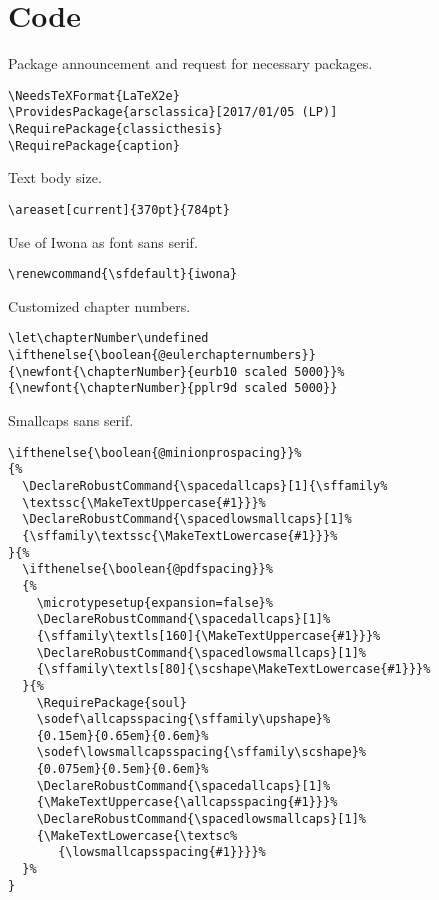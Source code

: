 
\chapter{Code}
\label{chp:code}
 
\lstset{numbers=left,
    numberstyle=\scriptsize,
    stepnumber=1,
    numbersep=8pt
}    



Package announcement and request for necessary packages.
\begin{lstlisting}[firstnumber=1]
\NeedsTeXFormat{LaTeX2e}
\ProvidesPackage{arsclassica}[2017/01/05 (LP)]
\RequirePackage{classicthesis}
\RequirePackage{caption}
\end{lstlisting}



Text body size.
\begin{lstlisting}
\areaset[current]{370pt}{784pt}
\end{lstlisting}



Use of Iwona as font sans serif.
\begin{lstlisting}
\renewcommand{\sfdefault}{iwona}
\end{lstlisting}



Customized chapter numbers.
\begin{lstlisting}
\let\chapterNumber\undefined 
\ifthenelse{\boolean{@eulerchapternumbers}}
{\newfont{\chapterNumber}{eurb10 scaled 5000}}% 
{\newfont{\chapterNumber}{pplr9d scaled 5000}}
\end{lstlisting}



Smallcaps sans serif.
\begin{lstlisting}
\ifthenelse{\boolean{@minionprospacing}}%
{%
  \DeclareRobustCommand{\spacedallcaps}[1]{\sffamily%
  \textssc{\MakeTextUppercase{#1}}}%
  \DeclareRobustCommand{\spacedlowsmallcaps}[1]%
  {\sffamily\textssc{\MakeTextLowercase{#1}}}%
}{%
  \ifthenelse{\boolean{@pdfspacing}}%
  {%
    \microtypesetup{expansion=false}%
    \DeclareRobustCommand{\spacedallcaps}[1]%
    {\sffamily\textls[160]{\MakeTextUppercase{#1}}}%
    \DeclareRobustCommand{\spacedlowsmallcaps}[1]%
    {\sffamily\textls[80]{\scshape\MakeTextLowercase{#1}}}%
  }{%
    \RequirePackage{soul} 
    \sodef\allcapsspacing{\sffamily\upshape}%
    {0.15em}{0.65em}{0.6em}%
    \sodef\lowsmallcapsspacing{\sffamily\scshape}%
    {0.075em}{0.5em}{0.6em}%   
    \DeclareRobustCommand{\spacedallcaps}[1]%
    {\MakeTextUppercase{\allcapsspacing{#1}}}%   
	\DeclareRobustCommand{\spacedlowsmallcaps}[1]%
	{\MakeTextLowercase{\textsc%
	   {\lowsmallcapsspacing{#1}}}}%
  }%
}
\end{lstlisting}




